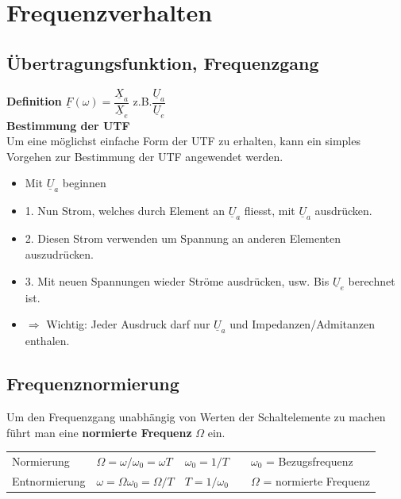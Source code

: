 \section{Frequenzverhalten}

	\subsection{Übertragungsfunktion, Frequenzgang}

		\textbf{Definition} 
		$\underline{F}(\omega) = \dfrac{\underline{X}_a}{\underline{X}_e}$ z.B.$\dfrac{\underline{U}_a}{\underline{U}_e}$\\
		
		\textbf{Bestimmung der UTF}\\
		Um eine möglichst einfache Form der UTF zu erhalten, kann ein simples Vorgehen zur Bestimmung der UTF angewendet werden.
		
		\begin{itemize}
			\item Mit $\underline{U}_a$ beginnen
			\item 1. Nun Strom, welches durch Element an $\underline{U}_a$ fliesst, mit $\underline{U}_a$ ausdrücken.
			\item 2. Diesen Strom verwenden um Spannung an anderen Elementen auszudrücken.
			\item 3. Mit neuen Spannungen wieder Ströme ausdrücken, usw. Bis $\underline{U}_e$ berechnet ist.
			\item $\Rightarrow$ Wichtig: Jeder Ausdruck darf nur $\underline{U}_a$ und Impedanzen/Admitanzen enthalen.
		\end{itemize} 
		
	\subsection{Frequenznormierung}
		Um den Frequenzgang unabhängig von Werten der Schaltelemente zu machen führt man eine \textbf{normierte Frequenz} $\Omega$ ein.
		
		\begin{tabular}{lllll}
			Normierung &
			$\Omega = \omega/\omega_0 = \omega T$ &
			$\omega_0 = 1/T$ & &
			$\omega_0$ = Bezugsfrequenz\\
			
			Entnormierung &
			$ \omega = \Omega\omega_0 = \Omega / T$ &
			$ T = 1 / \omega_0$ & &
			$\Omega$ = normierte Frequenz 
		\end{tabular}
		
